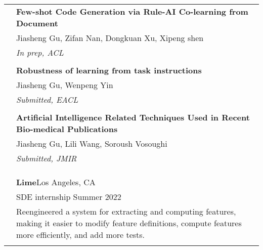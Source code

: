 \documentclass[letterpaper, 11pt]{article}
\begin{document}
\begin{longtable}{p{1.3in}p{4.8in}}

\nohyphens{\color{black}{Publications}}
& \textbf{Few-shot Code Generation via Rule-AI Co-learning from Document} \\
& Jiasheng Gu, Zifan Nan, Dongkuan Xu, Xipeng shen \\
& \textit{In prep, ACL}\\
& \\


& \textbf{Robustness of learning from task instructions} \\
& Jiasheng Gu, Wenpeng Yin \\
& \textit{Submitted, EACL}\\
& \\

& \textbf{Artificial Intelligence Related Techniques Used in Recent Bio-medical Publications} \\
& Jiasheng Gu, Lili Wang, Soroush Vosoughi \\
& \textit{Submitted, JMIR}\\
& \\


& \\


& \\


{\color{black}{Industry experience}} 
& {\textbf{Lime}}\hfill Los Angeles, CA \\
& SDE internship \hfill Summer 2022 \\
& Reengineered a system for extracting and computing features, making it easier to modify feature definitions, compute features more efficiently, and add more tests.\\
&\\


\end{longtable}
\end{document}
